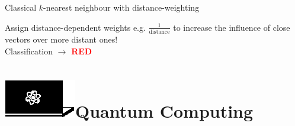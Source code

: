 \documentclass[10pt]{beamer}
\begin{document}
{\begin{frame}[fragile]{Classical $k$-nearest neighbour with distance-weighting}
\begin{minipage}[c]{0.49\textwidth}
\end{minipage}%
\begin{minipage}[c]{0.49\textwidth}
\vspace{0.3cm}
Assign distance-dependent weights e.g. $\frac{1}{\mathrm{distance}}$ to increase the influence of close vectors over more distant ones!\\
\newline
Classification $\rightarrow$ \textbf{\textcolor{red}{RED}}\\
\end{minipage}


\end{frame}
}


\section{\protect\includegraphics[scale=2.4]{Vectors/laptop_q.eps}\newline Quantum Computing}
\end{document}
